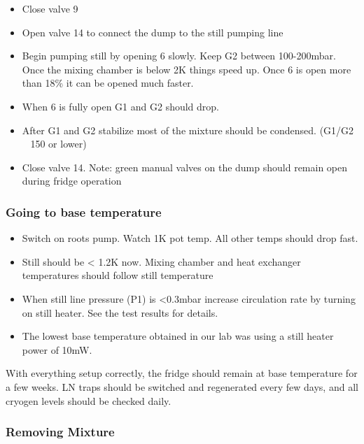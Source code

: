 \begin{itemize}
\item Close valve 9
\item Open valve 14 to connect the dump to the still pumping line
\item Begin pumping still by opening 6 slowly. Keep G2 between 100-200mbar. Once the mixing chamber is below 2K things speed up. Once 6 is open more than 18\% it can be opened much faster.
\item When 6 is fully open G1 and G2 should drop.
\item After G1 and G2 stabilize most of the mixture should be condensed. (G1/G2 ~ 150 or lower)
\item Close valve 14. Note: green manual valves on the dump should remain open during fridge operation
\end{itemize}

\subsubsection*{Going to base temperature}

\begin{itemize}
\item Switch on roots pump. Watch 1K pot temp. All other temps should drop fast.
\item Still should be < 1.2K now. Mixing chamber and heat exchanger temperatures should follow still temperature
\item When still line pressure (P1) is <0.3mbar increase circulation rate by turning on still heater. See the test results for details.
\item The lowest base temperature obtained in our lab was using a still heater power of 10mW.
\end{itemize}

With everything setup correctly, the fridge should remain at base temperature for a few weeks. LN traps should be switched and regenerated every few days, and all cryogen levels should be checked daily.

\subsubsection*{Removing Mixture}

